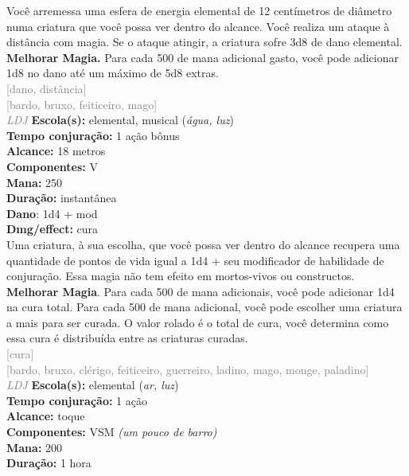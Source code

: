 \documentclass{RPG_Adventure}[2021/10/20]
\begin{document}
{\normalsize Você arremessa uma esfera de energia elemental de 12 centímetros de diâmetro numa criatura que você possa ver dentro do alcance. Você realiza um ataque à distância com magia. Se o ataque atingir, a criatura sofre 3d8 de dano elemental.\\\t \textbf{Melhorar Magia.} Para cada 500 de mana adicional gasto, você pode adicionar 1d8 no dano até um máximo de 5d8 extras.\\}
{\scriptsize \textcolor{gray}{[dano, distância]\\}}
{\scriptsize \textcolor{gray}{[bardo, bruxo, feiticeiro, mago]\\}}
{\tiny \textcolor{gray}{\textit{LDJ}}}
{\small \t \textbf{Escola(s):} elemental, musical (\textit{água, luz})\\\t \textbf{Tempo conjuração:} 1 ação bônus\\\t \textbf{Alcance:} 18 metros\\\t \textbf{Componentes:} V\\\t \textbf{Mana:} 250\\\t \textbf{Duração:} instantânea\\\t \textbf{Dano}: 1d4 + mod\\\t \textbf{Dmg/effect:} cura\\}
{\normalsize Uma criatura, à sua escolha, que você possa ver dentro do alcance recupera uma quantidade de pontos de vida igual a 1d4 + seu modificador de habilidade de conjuração. Essa magia não tem efeito em mortos-vivos ou constructos.\\\t \textbf{Melhorar Magia}. Para cada 500 de mana adicionais, você pode adicionar 1d4 na cura total. Para cada 500 de mana adicional, você pode escolher uma criatura a mais para ser curada. O valor rolado é o total de cura, você determina como essa cura é distribuída entre as criaturas curadas.\\}
{\scriptsize \textcolor{gray}{[cura]\\}}
{\scriptsize \textcolor{gray}{[bardo, bruxo, clérigo, feiticeiro, guerreiro, ladino, mago, monge, paladino]\\}}
{\tiny \textcolor{gray}{\textit{LDJ}}}
{\small \t \textbf{Escola(s):} elemental (\textit{ar, luz})\\\t \textbf{Tempo conjuração:} 1 ação\\\t \textbf{Alcance:} toque\\\t \textbf{Componentes:} VSM \textit{(um pouco de barro)}\\\t \textbf{Mana:} 200\\\t \textbf{Duração:} 1 hora\\}
\end{document}
